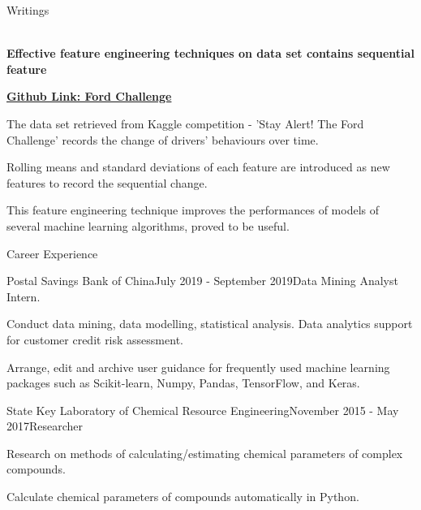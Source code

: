 \documentclass{resume} %
\begin{document}
\begin{rSection}{Writings}

\\{\bf Effective feature engineering techniques on data set contains sequential feature}

\href{https://github.com/HirahTang/Ford-Challenge}{\bf Github Link: Ford Challenge}

The data set retrieved from Kaggle competition - ’Stay Alert! The Ford Challenge’ records the change of drivers' behaviours over time.

Rolling means and standard deviations of each feature are introduced as new features to record the sequential change.

This feature engineering technique improves the performances of models of several machine learning algorithms, proved to be useful.


\end{rSection}


\begin{rSection}{Career Experience}

\begin{rSubsection}{Postal Savings Bank of China}{July 2019 - September 2019}{Data Mining Analyst Intern.}

\item Conduct data mining, data modelling, statistical analysis. Data analytics support for customer credit risk assessment.

\item Arrange, edit and archive user guidance for frequently used machine learning packages such as Scikit-learn, Numpy, Pandas, TensorFlow, and Keras.

\end{rSubsection}

\begin{rSubsection}{State Key Laboratory of Chemical Resource Engineering}{November 2015 - May 2017}{Researcher}{}
\item Research on methods of calculating/estimating chemical parameters of complex compounds.
\item Calculate chemical parameters of compounds automatically in Python.
\end{rSubsection}



\end{rSection}
\end{document}
